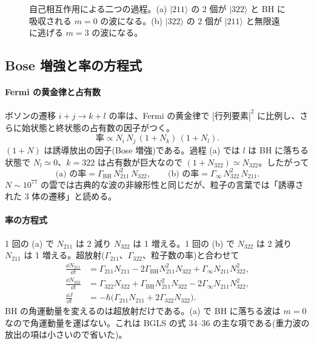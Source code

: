 \begin{figure}[H]
\centering

\caption{自己相互作用による二つの過程。(a) $|211\rangle$ の 2 個が $|322\rangle$ と BH に吸収される $m=0$ の波になる。(b) $|322\rangle$ の 2 個が $|211\rangle$ と無限遠に逃げる $m=3$ の波になる。}
\label{fig:processes}
\end{figure}

\subsection{Bose 増強と率の方程式}

\paragraph{Fermi の黄金律と占有数}
ボソンの遷移 $i+j\to k+l$ の率は、Fermi の黄金律で $|\text{行列要素}|^2$ に比例し、さらに始状態と終状態の占有数の因子がつく。
\begin{equation}
\text{率}\propto N_i\,N_j\,(1+N_k)\,(1+N_l).
\end{equation}
$(1+N)$ は誘導放出の因子(Bose 増強)である。過程 (a) では $l$ は BH に落ちる状態で $N_l\simeq0$、$k=322$ は占有数が巨大なので $(1+N_{322})\simeq N_{322}$。したがって
\begin{equation}
\text{(a) の率}=\Gamma_\mathrm{BH}\,N_{211}^2\,N_{322},\qquad
\text{(b) の率}=\Gamma_\infty\,N_{322}^2\,N_{211}.
\end{equation}
$N\sim10^{77}$ の雲では古典的な波の非線形性と同じだが、粒子の言葉では「誘導された 3 体の遷移」と読める。

\paragraph{率の方程式}
1 回の (a) で $N_{211}$ は 2 減り $N_{322}$ は 1 増える。1 回の (b) で $N_{322}$ は 2 減り $N_{211}$ は 1 増える。超放射($\Gamma_{211}$、$\Gamma_{322}$、粒子数の率)と合わせて
\begin{align}
\frac{\dd N_{211}}{\dd t}&=\Gamma_{211}N_{211}-2\Gamma_\mathrm{BH}N_{211}^2N_{322}+\Gamma_\infty N_{211}N_{322}^2,
\label{eq:rate211}\\
\frac{\dd N_{322}}{\dd t}&=\Gamma_{322}N_{322}+\Gamma_\mathrm{BH}N_{211}^2N_{322}-2\Gamma_\infty N_{211}N_{322}^2,
\label{eq:rate322}\\
\frac{\dd J}{\dd t}&=-\hbar\bigl(\Gamma_{211}N_{211}+2\Gamma_{322}N_{322}\bigr).
\label{eq:rateJ}
\end{align}
BH の角運動量を変えるのは超放射だけである。(a) で BH に落ちる波は $m=0$ なので角運動量を運ばない。これは BGLS の式 34--36 の主な項である(重力波の放出の項は小さいので省いた)。

